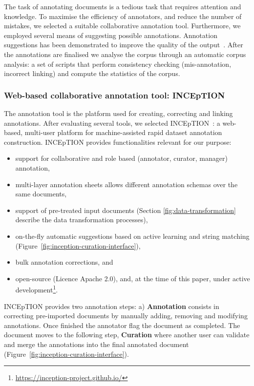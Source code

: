 \documentclass[fleqn,10pt]{wlscirep}
\begin{document}
The task of annotating documents is a tedious task that requires attention and knowledge. 
To maximise the efficiency of annotators, and reduce the number of mistakes, we selected a suitable collaborative annotation tool. Furthermore, we employed several means of suggesting possible annotations. 
Annotation suggestions has been demonstrated to improve the quality of the output~\cite{Fort2010InfluenceOP,Nvol2011SemiautomaticSA,Lingren2014EvaluatingTI}.
After the annotations are finalised we analyse the corpus through an automatic corpus analysis: a set of scripts that perform consistency checking (mis-annotation, incorrect linking) and compute the statistics of the corpus.

\subsubsection*{Web-based collaborative annotation tool: INCEpTION}
\label{subsec:annotation-tool}

The annotation tool is the platform used for creating, correcting and linking annotations.
After evaluating several tools, we selected INCEpTION~\cite{tubiblio106270,eckart-de-castilho-etal-2016-web}: a web-based, multi-user platform for machine-assisted rapid dataset annotation construction. 
INCEpTION provides functionalities relevant for our purpose: 
\begin{itemize}
    \item support for collaborative and role based (annotator, curator, manager) annotation, 
    \item multi-layer annotation sheets allows different annotation schemas over the same documents, 
    \item support of pre-treated input documents (Section \ref{fig:data-transformation} describe the data  transformation processes),
    \item on-the-fly automatic suggestions based on active learning and string matching (Figure~\ref{fig:inception-curation-interface}), 
    \item bulk annotation corrections, and 
    \item open-source (Licence Apache 2.0), and, at the time of this paper, under active development\footnote{\url{https://inception-project.github.io/}}.
\end{itemize}

INCEpTION provides two annotation steps: a) \textbf{Annotation} consists in correcting pre-imported documents by manually adding, removing and modifying annotations. Once finished the annotator flag the document as completed. The document moves to the following step, \textbf{Curation} where another user can validate and merge the annotations into the final annotated document (Figure~\ref{fig:inception-curation-interface}). 
\end{document}
